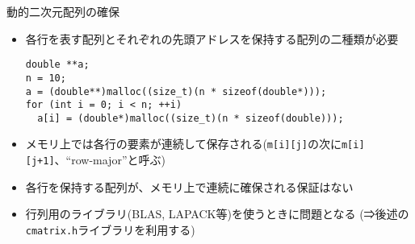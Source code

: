 \begin{frame}[t,fragile]{動的二次元配列の確保}
  \begin{itemize}
  \item 各行を表す配列とそれぞれの先頭アドレスを保持する配列の二種類が必要
    \begin{lstlisting}
double **a;
n = 10;  
a = (double**)malloc((size_t)(n * sizeof(double*)));
for (int i = 0; i < n; ++i)
  a[i] = (double*)malloc((size_t)(n * sizeof(double)));
    \end{lstlisting}
  \item メモリ上では各行の要素が連続して保存される(\verb+m[i][j]+の次に\verb!m[i][j+1]!、``row-major''と呼ぶ)
  \item 各行を保持する配列が、メモリ上で連続に確保される保証はない
  \item 行列用のライブラリ(BLAS, LAPACK等)を使うときに問題となる (⇒後述の\verb+cmatrix.h+ライブラリを利用する)
  \end{itemize}
\end{frame}
